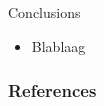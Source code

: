 \documentclass[handout]{beamer}
\begin{document}
\begin{frame}{Conclusions}
\scriptsize{

\begin{itemize}
\item Blablaag
\end{itemize}


} 
\end{frame}


\begin{frame}[allowframebreaks]\scriptsize
\frametitle{References}


%
\end{frame}  









\end{document}
